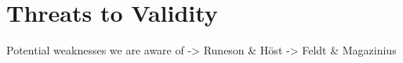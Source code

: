 \chapter{Threats to Validity}
Potential weaknesses we are aware of
-> Runeson \& Höst
-> Feldt \& Magazinius